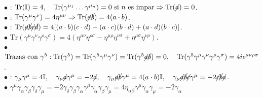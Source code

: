 $\bullet$ : $\text{Tr}(\mathbb{I}) = 4, \quad \text{Tr}(\gamma^{\mu_1} \dots \gamma^{\mu_n}) = 0 \text{ si } n \text{ es impar} \Rightarrow \text{Tr}(\cancel{a}) = 0$. \\
$\bullet$ : $\text{Tr}(\gamma^\mu \gamma^\nu) = 4\eta^{\mu\nu} \Rightarrow \text{Tr}(\cancel{a}\cancel{b}) = 4(a \cdot b)$. \\
$\bullet$ : $\text{Tr}(\cancel{a}\cancel{b}\cancel{c}\cancel{d}) = 4 [(a \cdot b)(c \cdot d) - (a \cdot c)(b \cdot d) + (a \cdot d)(b \cdot c)]$. \\
$\bullet$  $\text{Tr}(\gamma^\mu \gamma^\nu \gamma^\rho \gamma^\sigma) = 4 (\eta^{\mu \nu} \eta^{\rho \sigma} - \eta ^{\mu \rho} \eta ^{\nu \sigma} + \eta^{\mu \sigma} \eta^{\nu \rho})$.
\\
$\bullet$ $\text{Trazas con } \gamma^5: \text{Tr}(\gamma^5) = \text{Tr}(\gamma^5 \gamma^\mu \gamma^\nu) = \text{Tr}(\gamma^5 \cancel{a}\cancel{b}) = 0, \quad \text{Tr}(\gamma^5 \gamma^\mu \gamma^\nu \gamma^\rho \gamma^\sigma) = 4i \epsilon^{\mu\nu\rho\sigma}$. \\
$\bullet$ : $\gamma_\mu \gamma^\mu = 4\mathbb{I}, \quad \gamma_\mu \cancel{a} \gamma^\mu = -2\cancel{a}, \quad \gamma_\mu \cancel{a}\cancel{b} \gamma^\mu = 4(a \cdot b)\mathbb{I}, \quad \gamma_\mu \cancel{a}\cancel{b}\cancel{c} \gamma^\mu = -2\cancel{c}\cancel{b}\cancel{a}$.\\
$\bullet$ 
$\gamma^\mu \gamma_\alpha \gamma_\beta \gamma_\delta \gamma_\mu = -2 \gamma_\delta \gamma_\beta \gamma_\alpha$\quad$\gamma^\mu \gamma_\alpha \gamma_\beta \gamma_\mu = 4\eta_{\alpha\beta}$\quad$\gamma^\mu \gamma_\alpha \gamma_\mu = -2\gamma_\alpha$\\


